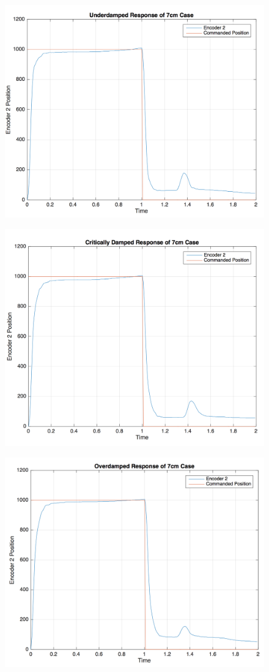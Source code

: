 \documentclass[12pt, a4paper]{article}
\begin{document}
\begin{figure}[H]
\centering
\includegraphics[width = \textwidth]{ud_m2.png}
\end{figure}
\begin{figure}[H]
\centering
\includegraphics[width = \textwidth]{cd_m2.png}
\end{figure}
\begin{figure}[H]
\centering
\includegraphics[width = \textwidth]{od_m2.png}
\end{figure}
\end{document}
